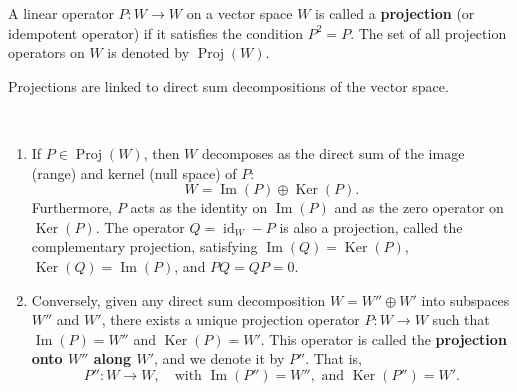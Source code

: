\begin{definition}
\label{def:projection_operator}
A linear operator $P: W \to W$ on a vector space $W$ is called a \textbf{projection} (or idempotent operator) if it satisfies the condition $P^2 = P$. The set of all projection operators on $W$ is denoted by $\operatorname{Proj}(W)$.
\end{definition}

Projections are linked to direct sum decompositions of the vector space.

\begin{proposition}
\label{prop:proj_direct_sum}\,
\begin{enumerate}
    \item If $P \in \operatorname{Proj}(W)$, then $W$ decomposes as the direct sum of the image (range) and kernel (null space) of $P$:
        \begin{equation} \label{eq:4.12}
        W = \operatorname{Im}(P) \oplus \operatorname{Ker}(P).
        \end{equation}
        Furthermore, $P$ acts as the identity on $\operatorname{Im}(P)$ and as the zero operator on $\operatorname{Ker}(P)$. The operator $Q = \operatorname{id}_W - P$ is also a projection, called the complementary projection, satisfying $\operatorname{Im}(Q) = \operatorname{Ker}(P)$, $\operatorname{Ker}(Q) = \operatorname{Im}(P)$, and $PQ = QP = 0$.
    \item Conversely, given any direct sum decomposition $W = W'' \oplus W'$ into subspaces $W''$ and $W'$, there exists a unique projection operator $P: W \to W$ such that $\operatorname{Im}(P) = W''$ and $\operatorname{Ker}(P) = W'$. This operator is called the \textbf{projection onto $W''$ along $W'$}, and we denote it by $P''$. That is,
\begin{equation} \label{eq:4.13}
P'' : W \longrightarrow W, \quad \text{with } \operatorname{Im}(P'') = W'', \text{ and } \operatorname{Ker}(P'') = W'.
\end{equation}

\end{enumerate}
\end{proposition}
